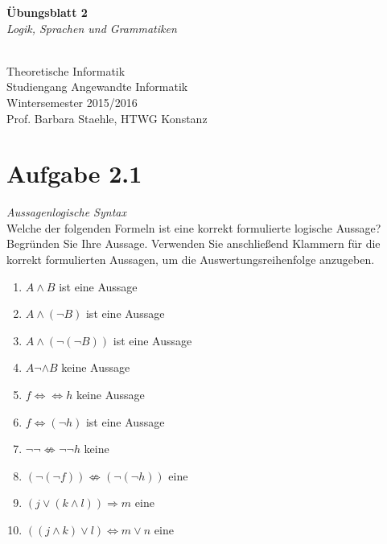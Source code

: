 \documentclass[12pt]{article}
\begin{document}
  \begin{center}
\begin{huge}
\textbf{Übungsblatt 2}\\
\textit{Logik, Sprachen und Grammatiken
}\end{huge} \\

Theoretische Informatik\\
Studiengang Angewandte Informatik\\
Wintersemester 2015/2016\\
Prof. Barbara Staehle, HTWG Konstanz
\end{center}
  \section*{Aufgabe 2.1}
  \textit{{Aussagenlogische Syntax}}
 \\
 Welche der folgenden Formeln ist eine korrekt formulierte logische Aussage? Begründen Sie Ihre Aussage. Verwenden Sie anschließend Klammern für die korrekt formulierten Aussagen, um die Auswertungsreihenfolge anzugeben.  
  
 \begin{enumerate} 
 \item $A \wedge B$ ist eine Aussage
 \item $A \wedge (\neg B)$ ist eine Aussage
 \item $A \wedge (\neg (\neg B))$ ist eine Aussage 
 \item $A \neg \wedge B$ keine Aussage 
 \item $f \Leftrightarrow \Leftrightarrow h$ keine Aussage 
 \item $f \Leftrightarrow (\neg h)$ ist eine Aussage
 \item $\neg \neg \not \Leftrightarrow \neg \neg h$ keine
 \item $(\neg (\neg f)) \not \Leftrightarrow (\neg (\neg h))$ eine 
 \item $(j \vee (k \wedge l)) \Rightarrow m$ eine 
 \item $((j \wedge k) \vee l) \Leftrightarrow m \vee n$ eine  
 \end{enumerate} 
  
  
  
  
  
\end{document}
